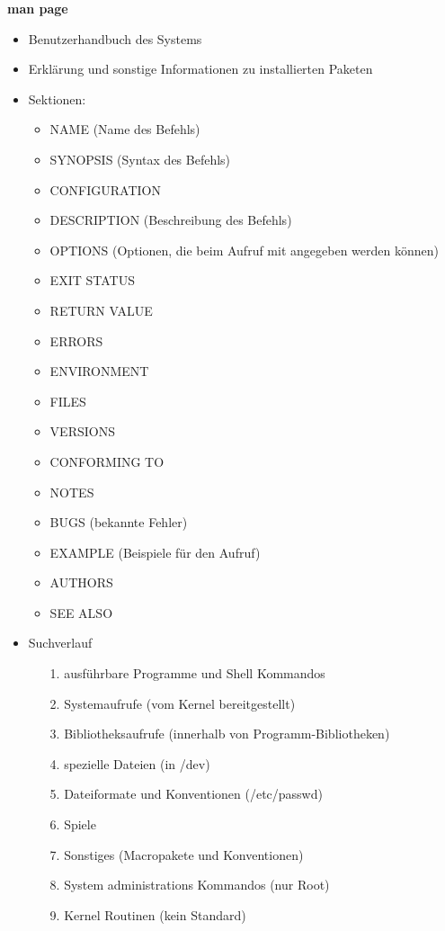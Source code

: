 \documentclass[12pt,utf8, 10pt]{article}
\begin{document}
\textbf{man page}
\begin{itemize}
	\item Benutzerhandbuch des Systems
	\item Erklärung und sonstige Informationen zu installierten Paketen
	\item Sektionen:
	\begin{itemize}
		\item NAME (Name des Befehls)
		\item SYNOPSIS (Syntax des Befehls)
		\item CONFIGURATION
		\item DESCRIPTION (Beschreibung des Befehls)
		\item OPTIONS (Optionen, die beim Aufruf mit angegeben werden können)
		\item EXIT STATUS
		\item RETURN VALUE
		\item ERRORS
		\item ENVIRONMENT
		\item FILES
		\item VERSIONS
		\item CONFORMING TO
		\item NOTES
		\item BUGS (bekannte Fehler)
		\item EXAMPLE (Beispiele für den Aufruf)
		\item AUTHORS
		\item SEE ALSO
	\end{itemize}
	\item Suchverlauf
	\begin{itemize}
		\item[1.] ausführbare Programme und Shell Kommandos
        \item[2.] Systemaufrufe (vom Kernel bereitgestellt)
        \item[3.] Bibliotheksaufrufe (innerhalb von Programm-Bibliotheken)
        \item[4.] spezielle Dateien (in /dev)
        \item[5.] Dateiformate und Konventionen (/etc/passwd)
        \item[6.] Spiele
        \item[7.] Sonstiges (Macropakete und Konventionen)
        \item[8.] System administrations Kommandos (nur Root)
        \item[9.] Kernel Routinen (kein Standard)
	\end{itemize}
\end{itemize}
\end{document}
